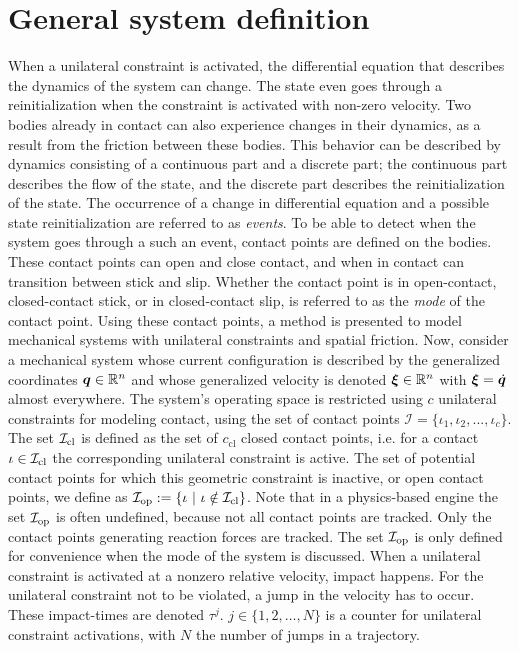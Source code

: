 \documentclass[../DC2017114Bouma.tex]{subfiles}
\begin{document}
\section{General system definition}
When a unilateral constraint is activated, the differential equation that describes the dynamics of the system can change. The state even goes through a reinitialization when the constraint is activated with non-zero velocity. Two bodies already in contact can also experience changes in their dynamics, as a result from the friction between these bodies. This behavior can be described by dynamics consisting of a continuous part and a discrete part; the continuous part describes the flow of the state, and the discrete part describes the reinitialization of the state. The occurrence of a change in differential equation and a possible state reinitialization are referred to as \textit{events}. To be able to detect when the system goes through a such an event, contact points are defined on the bodies. These contact points can open and close contact, and when in contact can transition between stick and slip. Whether the contact point is in open-contact, closed-contact stick, or in closed-contact slip, is referred to as the \textit{mode} of the contact point. Using these contact points, a method is presented to model mechanical systems with unilateral constraints and spatial friction. Now, consider a mechanical system whose current configuration is described by the generalized coordinates ${\boldsymbol{q}}\in\mathbb{R}^n$ and whose generalized velocity is denoted $\boldsymbol{\xi}\in\mathbb{R}^n$ with $\boldsymbol{\xi}=\dot{{\boldsymbol{q}}}$ almost everywhere. The system's operating space is restricted using $c$ unilateral constraints for modeling contact, using the set of contact points $\mathcal{I}=\{\iota_1,\iota_2,...,\iota_c\}$. The set $\mathcal{I}_{\text{cl}}$ is defined as the set of $c_{\text{cl}}$ closed contact points, i.e. for a contact $\iota\in\mathcal{I}_{\text{cl}}$ the corresponding unilateral constraint is active. The set of potential contact points for which this geometric constraint is inactive, or open contact points, we define as $\Ic_{\text{op}} := \{\iota\ |\ \iota\notin\Ic_{\text{cl}}\}$. Note that in a physics-based engine the set $\mathcal{I}_{\text{op}}$ is often undefined, because not all contact points are tracked. Only the contact points generating reaction forces are tracked. The set $\mathcal{I}_{\text{op}}$ is only defined for convenience when the mode of the system is discussed. When a unilateral constraint is activated at a nonzero relative velocity, impact happens. For the unilateral constraint not to be violated, a jump in the velocity has to occur. These impact-times are denoted $\tau^j$. $j\in \{1,2,\dots,N\}$ is a counter for unilateral constraint activations, with $N$ the number of jumps in a trajectory.
\end{document}
